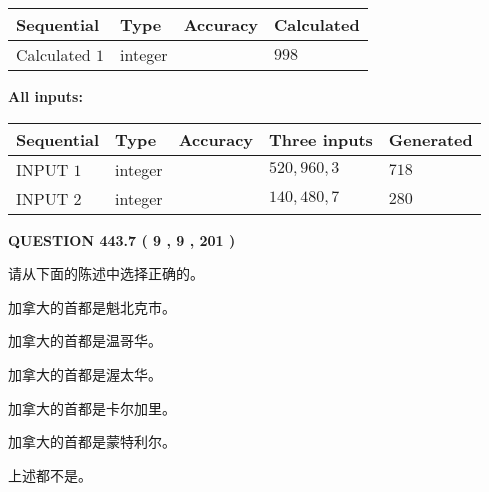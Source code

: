 \documentclass{ctexart}
\begin{document}
   
   
   
\noindent{}
   
   
  
  
\noindent\begin{tabular}{|l|l|l|l|}
\hline
 Sequential & Type & Accuracy & Calculated \\ 
\hline
 
 
  Calculated $  1 $ & integer &  & 
  $ 998 $ 
 \\  \hline  
 \end{tabular}
   
   
   
   
\noindent\vspace{0.1in}\hspace{-0.08in} {\textbf{\Large{All inputs: }}}
   
   
  
  
\noindent\begin{tabular}{|l|l|l|l|l|}
\hline
 Sequential & Type & Accuracy & Three inputs & Generated \\ 
\hline
 
 
  INPUT $  1 $ & integer &  & $
 520
 , 
 960
 , 
 3
 $ & $ 718 $ 
 \\  \hline  
 
 
  INPUT $  2 $ & integer &  & $
 140
 , 
 480
 , 
 7
 $ & $ 280 $ 
 \\  \hline  
 \end{tabular}
   
   
  
\vspace{0.2in}
  
{\textbf{\Large{QUESTION
443.7 
 ( 9 , 9 , 201 )
}}}
  
  
请从下面的陈述中选择正确的。
 
 
加拿大的首都是魁北克市。
 
 
加拿大的首都是温哥华。
 
 
加拿大的首都是渥太华。
 
 
加拿大的首都是卡尔加里。
 
 
加拿大的首都是蒙特利尔。
 
 
 上述都不是。
 
 
\noindent{}
 
\end{document}
